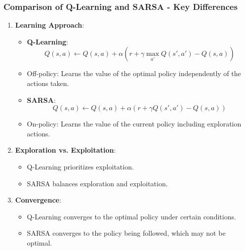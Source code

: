 \documentclass[aspectratio=169]{beamer}
\begin{document}
\begin{frame}[fragile]
    \frametitle{Comparison of Q-Learning and SARSA - Key Differences}
    \begin{enumerate}
        \item \textbf{Learning Approach}:
            \begin{itemize}
                \item \textbf{Q-Learning}:
                    \begin{equation}
                    Q(s, a) \leftarrow Q(s, a) + \alpha \left( r + \gamma \max_{a'} Q(s', a') - Q(s, a) \right)
                    \end{equation}
                    \item Off-policy: Learns the value of the optimal policy independently of the actions taken.
                \item \textbf{SARSA}:
                    \begin{equation}
                    Q(s, a) \leftarrow Q(s, a) + \alpha \left( r + \gamma Q(s', a') - Q(s, a) \right)
                    \end{equation}
                    \item On-policy: Learns the value of the current policy including exploration actions.
            \end{itemize}
        \item \textbf{Exploration vs. Exploitation}:
            \begin{itemize}
                \item Q-Learning prioritizes exploitation.
                \item SARSA balances exploration and exploitation.
            \end{itemize}
        \item \textbf{Convergence}:
            \begin{itemize}
                \item Q-Learning converges to the optimal policy under certain conditions.
                \item SARSA converges to the policy being followed, which may not be optimal.
            \end{itemize}
    \end{enumerate}
\end{frame}
\end{document}
